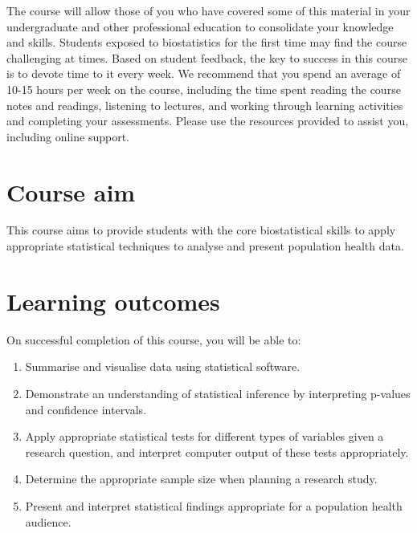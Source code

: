 \documentclass[
  a4paper,
]{memoir}
\providecommand{\tightlist}{%
  \setlength{\itemsep}{0pt}\setlength{\parskip}{0pt}}
\begin{document}
The course will allow those of you who have covered some of this
material in your undergraduate and other professional education to
consolidate your knowledge and skills. Students exposed to biostatistics
for the first time may find the course challenging at times. Based on
student feedback, the key to success in this course is to devote time to
it every week. We recommend that you spend an average of 10-15 hours per
week on the course, including the time spent reading the course notes
and readings, listening to lectures, and working through learning
activities and completing your assessments. Please use the resources
provided to assist you, including online support.

\section*{Course aim}\label{course-aim}


This course aims to provide students with the core biostatistical skills
to apply appropriate statistical techniques to analyse and present
population health data.

\section*{Learning outcomes}\label{learning-outcomes}


On successful completion of this course, you will be able to:

\begin{enumerate}
\def\labelenumi{\arabic{enumi}.}
\tightlist
\item
  Summarise and visualise data using statistical software.
\item
  Demonstrate an understanding of statistical inference by interpreting
  p-values and confidence intervals.
\item
  Apply appropriate statistical tests for different types of variables
  given a research question, and interpret computer output of these
  tests appropriately.
\item
  Determine the appropriate sample size when planning a research study.
\item
  Present and interpret statistical findings appropriate for a
  population health audience.
\end{enumerate}
\end{document}
